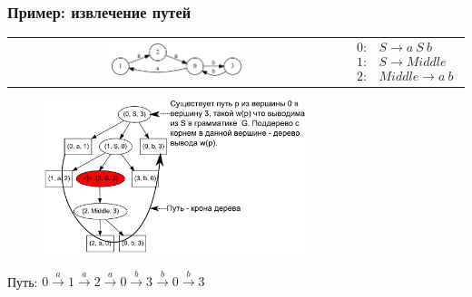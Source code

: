 \documentclass[xcolor=table,aspectratio=169]{beamer}
\begin{document}
\begin{frame}[fragile]
  \transwipe[direction=90]
  \frametitle{Пример: извлечение путей}
\begin{center}
\begin{tabular}{  c  c  }
    \includegraphics[width=0.4\textwidth]{pictures/input.pdf}
    &
$
 
\begin{array}{rl} 
   0:& S \rightarrow a \ S \ b \\
   1:& S \rightarrow Middle \\
   2:& Middle \rightarrow a \ b
\end{array}

$
\end{tabular}

\begin{figure}[ht]
    \centering
        \includegraphics[width=0.68\textwidth]{pictures/AnBn_2_m.pdf}      
\end{figure}
Путь: $0\xrightarrow{a}1\xrightarrow{a}2\xrightarrow{a}0\xrightarrow{b}3\xrightarrow{b}0\xrightarrow{b}3$
\end{center}                
\end{frame}
\end{document}
